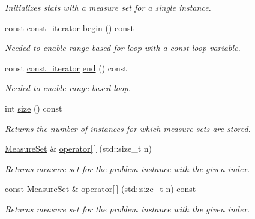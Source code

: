 \begin{DoxyCompactItemize}
\begin{DoxyCompactList}\small\item\em Initializes stats with a measure set for a single instance. \end{DoxyCompactList}\item 
const \hyperlink{structslb_1_1core_1_1sb_1_1Stats_a34123246b559ca14a67acc484d3635c0}{const\+\_\+iterator} \hyperlink{structslb_1_1core_1_1sb_1_1Stats_a9daea6443b76cafc3b7c2964434aa3ea}{begin} () const 
\begin{DoxyCompactList}\small\item\em Needed to enable range-\/based for-\/loop with a const loop variable. \end{DoxyCompactList}\item 
const \hyperlink{structslb_1_1core_1_1sb_1_1Stats_a34123246b559ca14a67acc484d3635c0}{const\+\_\+iterator} \hyperlink{structslb_1_1core_1_1sb_1_1Stats_a8ec1b07f988bf92839ab197b2219e208}{end} () const 
\begin{DoxyCompactList}\small\item\em Needed to enable range-\/based loop. \end{DoxyCompactList}\item 
int \hyperlink{structslb_1_1core_1_1sb_1_1Stats_ada2e52fa27798a9d066743f814aa3658}{size} () const 
\begin{DoxyCompactList}\small\item\em Returns the number of instances for which measure sets are stored. \end{DoxyCompactList}\item 
\hyperlink{structslb_1_1core_1_1sb_1_1MeasureSet}{Measure\+Set} \& \hyperlink{structslb_1_1core_1_1sb_1_1Stats_ae824f5480f1fcaafd5ee8147e2e026a8}{operator\mbox{[}$\,$\mbox{]}} (std\+::size\+\_\+t n)
\begin{DoxyCompactList}\small\item\em Returns measure set for the problem instance with the given index. \end{DoxyCompactList}\item 
const \hyperlink{structslb_1_1core_1_1sb_1_1MeasureSet}{Measure\+Set} \& \hyperlink{structslb_1_1core_1_1sb_1_1Stats_aaa274f0731ba96ea84d3ceeb53d46214}{operator\mbox{[}$\,$\mbox{]}} (std\+::size\+\_\+t n) const 
\begin{DoxyCompactList}\small\item\em Returns measure set for the problem instance with the given index. \end{DoxyCompactList}\item 

\end{DoxyCompactItemize}
